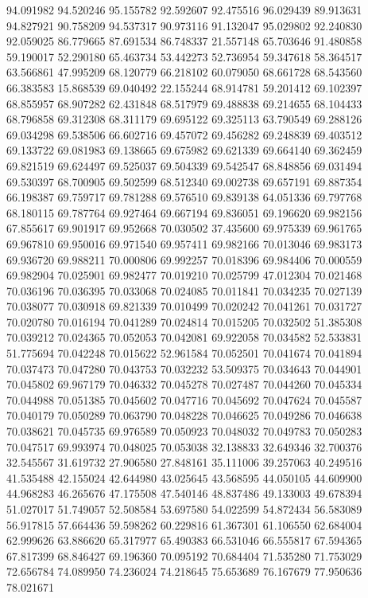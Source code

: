 94.091982
94.520246
95.155782
92.592607
92.475516
96.029439
89.913631
94.827921
90.758209
94.537317
90.973116
91.132047
95.029802
92.240830
92.059025
86.779665
87.691534
86.748337
21.557148
65.703646
91.480858
59.190017
52.290180
65.463734
53.442273
52.736954
59.347618
58.364517
63.566861
47.995209
68.120779
66.218102
60.079050
68.661728
68.543560
66.383583
15.868539
69.040492
22.155244
68.914781
59.201412
69.102397
68.855957
68.907282
62.431848
68.517979
69.488838
69.214655
68.104433
68.796858
69.312308
68.311179
69.695122
69.325113
63.790549
69.288126
69.034298
69.538506
66.602716
69.457072
69.456282
69.248839
69.403512
69.133722
69.081983
69.138665
69.675982
69.621339
69.664140
69.362459
69.821519
69.624497
69.525037
69.504339
69.542547
68.848856
69.031494
69.530397
68.700905
69.502599
68.512340
69.002738
69.657191
69.887354
66.198387
69.759717
69.781288
69.576510
69.839138
64.051336
69.797768
68.180115
69.787764
69.927464
69.667194
69.836051
69.196620
69.982156
67.855617
69.901917
69.952668
70.030502
37.435600
69.975339
69.961765
69.967810
69.950016
69.971540
69.957411
69.982166
70.013046
69.983173
69.936720
69.988211
70.000806
69.992257
70.018396
69.984406
70.000559
69.982904
70.025901
69.982477
70.019210
70.025799
47.012304
70.021468
70.036196
70.036395
70.033068
70.024085
70.011841
70.034235
70.027139
70.038077
70.030918
69.821339
70.010499
70.020242
70.041261
70.031727
70.020780
70.016194
70.041289
70.024814
70.015205
70.032502
51.385308
70.039212
70.024365
70.052053
70.042081
69.922058
70.034582
52.533831
51.775694
70.042248
70.015622
52.961584
70.052501
70.041674
70.041894
70.037473
70.047280
70.043753
70.032232
53.509375
70.034643
70.044901
70.045802
69.967179
70.046332
70.045278
70.027487
70.044260
70.045334
70.044988
70.051385
70.045602
70.047716
70.045692
70.047624
70.045587
70.040179
70.050289
70.063790
70.048228
70.046625
70.049286
70.046638
70.038621
70.045735
69.976589
70.050923
70.048032
70.049783
70.050283
70.047517
69.993974
70.048025
70.053038
32.138833
32.649346
32.700376
32.545567
31.619732
27.906580
27.848161
35.111006
39.257063
40.249516
41.535488
42.155024
42.644980
43.025645
43.568595
44.050105
44.609900
44.968283
46.265676
47.175508
47.540146
48.837486
49.133003
49.678394
51.027017
51.749057
52.508584
53.697580
54.022599
54.872434
56.583089
56.917815
57.664436
59.598262
60.229816
61.367301
61.106550
62.684004
62.999626
63.886620
65.317977
65.490383
66.531046
66.555817
67.594365
67.817399
68.846427
69.196360
70.095192
70.684404
71.535280
71.753029
72.656784
74.089950
74.236024
74.218645
75.653689
76.167679
77.950636
78.021671
